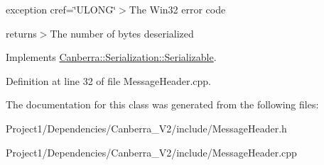 exception cref=\char`\"{}\+U\+L\+O\+N\+G\char`\"{}$>$The Win32 error code

returns$>$The number of bytes deserialized

Implements \hyperlink{class_canberra_1_1_serialization_1_1_serializable}{Canberra\+::\+Serialization\+::\+Serializable}.



Definition at line 32 of file Message\+Header.\+cpp.



The documentation for this class was generated from the following files\+:\begin{DoxyCompactItemize}
\item 
Project1/\+Dependencies/\+Canberra\+\_\+\+V2/include/Message\+Header.\+h\item 
Project1/\+Dependencies/\+Canberra\+\_\+\+V2/include/Message\+Header.\+cpp\end{DoxyCompactItemize}
